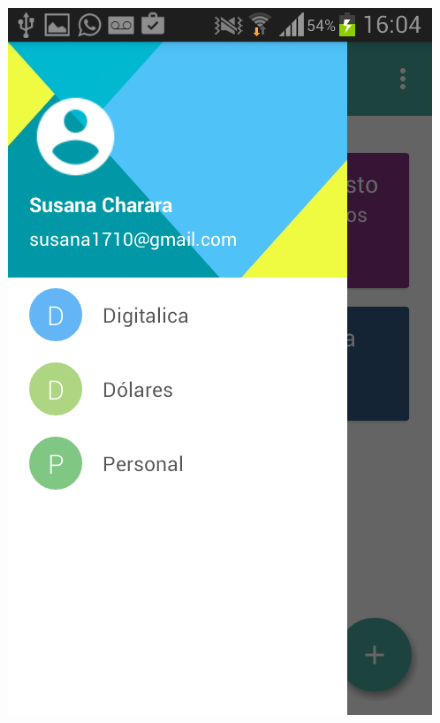 \begin{figure}[ht]
\begin{minipage}{.5\textwidth}
\centering
  \includegraphics[scale=0.30,type=png,ext=.png,read=.png]{imagenes/Screenshots/sidebar}
  \captionsetup{justification=centering}
  \label{fig:interfazCambiarCuenta}\end{minipage}
\end{figure}

